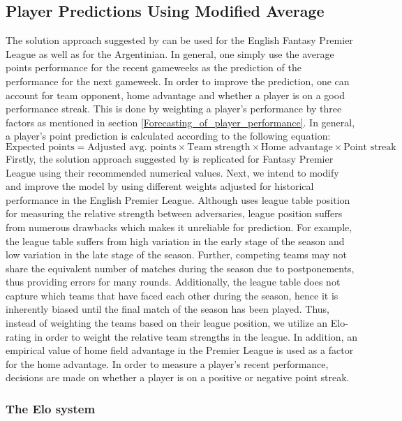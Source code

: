 \subsection{Player Predictions Using Modified Average}
The solution approach suggested by \cite{Bonomo} can be used for the English Fantasy Premier League as well as for the Argentinian. In general, one simply use the average points performance for the recent gameweeks as the prediction of the performance for the next gameweek. In order to improve the prediction, one can account for team opponent, home advantage and whether a player is on a good performance streak. This is done by weighting a player's performance by three factors as mentioned in section \ref{Forecasting_of_player_performance}.
\newpar
In general, a player's point prediction is calculated according to the following equation:
\begin{equation}
    \textrm{Expected points} = \textrm{Adjusted avg. points} \times \textrm{Team strength} \times \textrm{Home advantage} \times \textrm{Point streak}
\end{equation}
\newpar
Firstly, the solution approach suggested by \cite{Bonomo} is replicated for Fantasy Premier League using their recommended numerical values. Next, we intend to modify and improve the model by using different weights adjusted for historical performance in the English Premier League. Although \cite{Bonomo} uses league table position for measuring the relative strength between adversaries, league position suffers from numerous drawbacks which makes it unreliable for prediction. For example, the league table suffers from high variation in the early stage of the season and low variation in the late stage of the season. Further, competing teams may not share the equivalent number of matches during the season due to postponements, thus providing errors for many rounds. Additionally, the league table does not capture which teams that have faced each other during the season, hence it is inherently biased until the final match of the season has been played. Thus, instead of weighting the teams based on their league position, we utilize an Elo-rating in order to weight the relative team strengths in the league. In addition, an empirical value of home field advantage in the Premier League is used as a factor for the home advantage. In order to measure a player's recent performance, decisions are made on whether a player is on a positive or negative point streak. 
\subsubsection{The Elo system}

